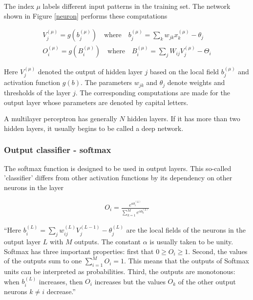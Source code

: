 The index $ \mu $ labels different input patterns in the training set. The network shown in Figure \ref{neuron} performs these computations \cite{mehlig}

\begin{gather}
V_j^{(\mu)} = g(b_j^{(\mu)}) \quad \text{where} \quad b_j^{(\mu)} = \sum_{k} w_{jk} x_{k}^{(\mu)} - \theta_{j} \\
O_i^{(\mu)} = g(B_i^{(\mu)}) \quad \text{where} \quad B_i^{(\mu)} = \sum_{j} W_{ij} V_{j}^{(\mu)} - \Theta_{i} 
\end{gather}

Here $ V_j^{(\mu)} $ denoted the output of hidden layer $ j $ based on the local field $ b_j^{(\mu)} $ and activation function $ g(b) $. The parameters $ w_{jk} $ and $ \theta_{j} $ denote weights and thresholds of the layer $ j $. The corresponding computations are made for the output layer whose parameters are denoted by capital letters. 

A multilayer perceptron has generally $ N $ hidden layers. If it has more than two hidden layers, it usually begins to be called a deep network. 

\subsubsection{Output classifier - softmax}

The softmax function is designed to be used in output layers. This so-called 'classifier' differs from other activation functions by its dependency on other neurons in the layer \cite{mehlig}

\begin{gather}
O_{i} = \frac{e^{\alpha b_i^{(L)}}}{\sum_{k=1}^{M} e^{\alpha b_k^{(L)}}}
\end{gather}

\enquote{Here $ b_{i}^{(L)} = \sum_{j}w_{ij}^{(L)} V_{j}^{(L-1)} - \theta _{j}^{(L)} $  are the local fields of the neurons in the output layer $ L $ with $ M $ outputs. The constant $\alpha$ is usually taken to be unity. Softmax has three important properties: first that $ 0 \geq O_i \geq 1 $. Second, the values of the outputs sum to one $ \sum_{i=1}^{M} O_i = 1 $. This means that the outputs of Softmax units can be interpreted as probabilities. Third, the outputs are monotonous: when $ b_i^{(L)} $ increases, then $ O_i $ increases but the values $ O_k $ of the other output neurons $ k \neq i $ decrease.} \cite{mehlig}

